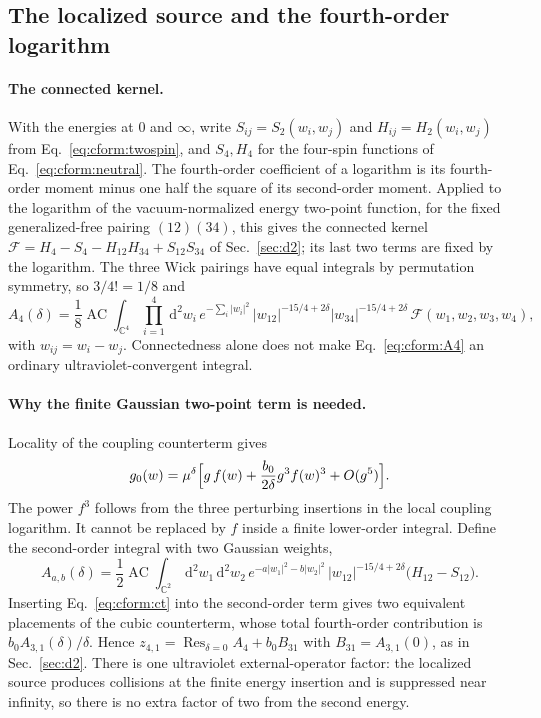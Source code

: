 \documentclass[11pt,a4paper]{article}
\numberwithin{equation}{section}
\newcommand{\dd}{\,\mathrm d}
\newcommand{\AC}{\operatorname{AC}}
\newcommand{\Res}{\operatorname*{Res}_{\delta=0}}
\begin{document}
\subsection{The localized source and the fourth-order logarithm}\label{app:cform:source}
\paragraph{The connected kernel.} With the energies at $0$ and $\infty$, write $S_{ij}=S_2(w_i,w_j)$ and
$H_{ij}=H_2(w_i,w_j)$ from Eq.~\eqref{eq:cform:twospin}, and $S_4,H_4$ for the four-spin functions of
Eq.~\eqref{eq:cform:neutral}. The fourth-order coefficient of a logarithm is its fourth-order moment minus one half
the square of its second-order moment. Applied to the logarithm of the vacuum-normalized energy two-point function,
for the fixed generalized-free pairing $(12)(34)$, this gives the connected kernel
$\mathcal F=H_4-S_4-H_{12}H_{34}+S_{12}S_{34}$ of Sec.~\ref{sec:d2}; its last two terms are fixed by the logarithm.
The three Wick pairings have equal integrals by permutation symmetry, so $3/4!=1/8$ and
\begin{equation}
 A_4(\delta)=\frac18\AC\!\int_{\mathbb C^4}\prod_{i=1}^4\dd^2w_i\,e^{-\sum_i|w_i|^2}\,
 |w_{12}|^{-15/4+2\delta}|w_{34}|^{-15/4+2\delta}\,\mathcal F(w_1,w_2,w_3,w_4),
 \label{eq:cform:A4}
\end{equation}
with $w_{ij}=w_i-w_j$. Connectedness alone does not make Eq.~\eqref{eq:cform:A4} an ordinary ultraviolet-convergent
integral.

\paragraph{Why the finite Gaussian two-point term is needed.} Locality of the coupling counterterm gives
\begin{equation}
 g_0(w)=\mu^\delta\Bigl[g\,f(w)+\frac{b_0}{2\delta}g^3f(w)^3+O(g^5)\Bigr].
 \label{eq:cform:ct}
\end{equation}
The power $f^3$ follows from the three perturbing insertions in the local coupling logarithm. It cannot be replaced by
$f$ inside a finite lower-order integral. Define the second-order integral with two Gaussian weights,
\begin{equation}
 A_{a,b}(\delta)=\frac12\AC\!\int_{\mathbb C^2}\dd^2w_1\dd^2w_2\,e^{-a|w_1|^2-b|w_2|^2}\,
 |w_{12}|^{-15/4+2\delta}\bigl(H_{12}-S_{12}\bigr).
 \label{eq:cform:Aab}
\end{equation}
Inserting Eq.~\eqref{eq:cform:ct} into the second-order term gives two equivalent placements of the cubic
counterterm, whose total fourth-order contribution is $b_0A_{3,1}(\delta)/\delta$. Hence $z_{4,1}=\Res A_4+b_0B_{31}$
with $B_{31}=A_{3,1}(0)$, as in Sec.~\ref{sec:d2}. There is one ultraviolet external-operator factor: the localized
source produces collisions at the finite energy insertion and is suppressed near infinity, so there is no extra
factor of two from the second energy.
\end{document}

